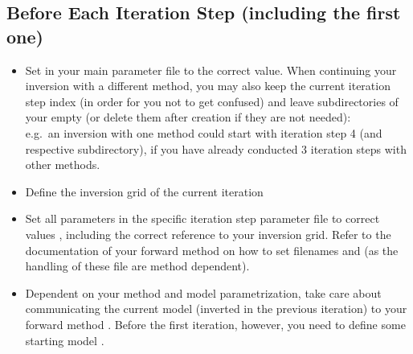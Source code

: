 \subsection*{Before Each Iteration Step (including the first one)}
%
\begin{itemize}
\item Set 
in your main parameter file to the correct value. When continuing your inversion with a different method, you
may also keep the current iteration step index (in order for you not to get confused) and leave 
subdirectories of your  empty (or delete them after creation if they 
are not needed):\\
e.g.\ an inversion with one method could start with iteration step 4 (and respective subdirectory), 
if you have already conducted 3 iteration steps with other methods.
%
\item Define the inversion grid of the current iteration 
%
\item Set all parameters in the specific iteration step parameter file to correct values 
, including the correct reference to your inversion grid.
Refer to the documentation of your forward method on how to set filenames 
and  (as the handling of these file are method dependent).
%
\item Dependent on your method and model parametrization, take care about communicating the current
model (inverted in the previous iteration) to your forward method . 
Before the first iteration, however, you need to define some starting model .
%
\end{itemize}
%
